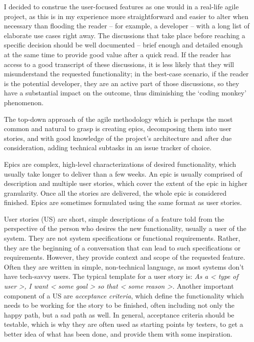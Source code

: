 I decided to construe the user-focused features as one would in a real-life agile project,
as this is in my experience more straightforward and easier to alter when necessary than flooding the reader -- for example, a developer -- with a long list of elaborate use cases right away.
The discussions that take place before reaching a specific decision should be well documented -- brief enough and detailed enough at the same time to provide good value after a quick read.
If the reader has access to a good transcript of these discussions, it is less likely that they will misunderstand the requested functionality;
in the best-case scenario, if the reader is the potential developer, they are an active part of those discussions, so they have a substantial impact on the outcome, thus diminishing the `coding monkey' phenomenon.

The top-down approach of the agile methodology which is perhaps the most common and natural to grasp is creating epics, decomposing them into user stories,
and with good knowledge of the project's architecture and after due consideration, adding technical subtasks in an issue tracker of choice.

Epics are complex, high-level characterizations of desired functionality, which usually take longer to deliver than a few weeks.
An epic is usually comprised of description and multiple user stories, which cover the extent of the epic in higher granularity.
Once all the stories are delivered, the whole epic is considered finished.
Epics are sometimes formulated using the same format as user stories.

User stories (US) are short, simple descriptions of a feature told from the perspective of the person who desires the new functionality, usually a user of the system.\cite{user-story-definition}
They are not system specifications or functional requirements.
Rather, they are the beginning of a conversation that can lead to such specifications or requirements.
However, they provide context and scope of the requested feature.
Often they are written in simple, non-technical language, as most systems don't have tech-savvy users.
The typical template for a user story is:
\textit{As a < type of user >, I want < some goal > so that < some reason >.}\cite{user-story-definition}
Another important component of a US are \textit{acceptance criteria}, which define the functionality which needs to be working for the story to be finished, often including not only the happy path, but a sad path as well.
In general, acceptance criteria should be testable, which is why they are often used as starting points by testers, to get a better idea of what has been done, and provide them with some inspiration.

